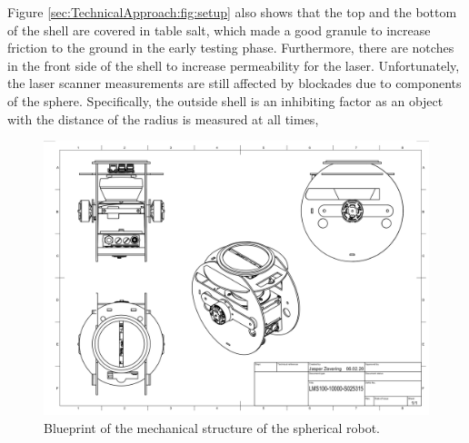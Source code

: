 Figure \ref{sec:TechnicalApproach:fig:setup} also shows that the top and the bottom of the shell are covered in table salt, which made a good granule to increase friction to the ground in the early testing phase. Furthermore, there are notches in the front side of the shell to increase permeability for the laser.
Unfortunately, the laser scanner measurements are still affected by blockades due to components of the sphere.
Specifically, the outside shell is an inhibiting factor as an object with the distance of the radius is measured at all times, 
                                                                                                                                                                                                                  
\begin{figure}                                                                                                                                                                                                    
\centering                                                                                                                                                                                                        
\includegraphics[width=\textwidth]{../Media/BlueprintPNG.png}                                                                                                                                                      
\caption{Blueprint of the mechanical structure of the spherical robot.}                                                                                                                                   
\label{sec:TechnicalApproach:fig:blueprint}                                                                                                                                                                       
\end{figure}                                                                                                                                                                                                      
                                                                                                                                                                                                                  
